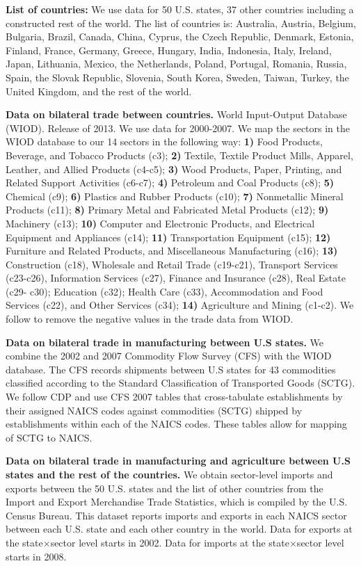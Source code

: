 \documentclass[12pt]{article}
\begin{document}
\textbf{List of countries:} We use data for 50 U.S. states, 37 other countries including a constructed rest of the world. The list of countries is: Australia, Austria, Belgium, Bulgaria, Brazil, Canada, China, Cyprus, the Czech Republic, Denmark, Estonia, Finland, France, Germany, Greece, Hungary, India, Indonesia, Italy, Ireland, Japan, Lithuania,
Mexico, the Netherlands, Poland, Portugal, Romania, Russia, Spain, the Slovak Republic, Slovenia, South Korea, Sweden, Taiwan, Turkey, the United Kingdom, and the rest of the world.

\textbf{Data on bilateral trade between countries.} World Input-Output Database (WIOD). Release of 2013. We use data for 2000-2007. We map the sectors in the WIOD database to our 14 sectors in the following way: \textbf{1)} Food Products, Beverage, and Tobacco Products (c3); \textbf{2)} Textile, Textile Product Mills, Apparel, Leather, and Allied Products (c4-c5); \textbf{3)} Wood Products, Paper, Printing, and Related Support Activities (c6-c7); \textbf{4)} Petroleum and Coal Products (c8); \textbf{5)} Chemical (c9); \textbf{6)} Plastics and Rubber Products (c10); \textbf{7)} Nonmetallic Mineral Products (c11); \textbf{8)} Primary Metal and Fabricated Metal Products (c12); \textbf{9)} Machinery (c13); \textbf{10)} Computer and Electronic Products, and Electrical Equipment and Appliances (c14); \textbf{11)} Transportation Equipment (c15); \textbf{12)} Furniture and Related Products, and Miscellaneous Manufacturing (c16); \textbf{13)} Construction (c18), Wholesale and Retail Trade (c19-c21), Transport Services (c23-c26), Information Services (c27), Finance and Insurance (c28), Real Estate (c29-
c30); Education (c32); Health Care (c33), Accommodation and Food Services (c22), and Other Services (c34); \textbf{14)} Agriculture and Mining (c1-c2). We follow \cite{Costinot2014} to remove the negative values in the trade data from WIOD.

\textbf{Data on bilateral trade in manufacturing between U.S states.} We combine the 2002 and 2007 Commodity Flow Survey (CFS) with the WIOD database. The CFS records shipments between U.S states for 43 commodities classified according to the Standard Classification of Transported Goods (SCTG). We follow CDP and use CFS 2007 tables that cross-tabulate establishments by their assigned NAICS codes against commodities (SCTG) shipped by establishments within each of the NAICS codes. These tables allow for mapping of SCTG to NAICS.

\textbf{Data on bilateral trade in manufacturing and agriculture between U.S states and the rest of the countries.} We obtain sector-level imports and exports  between the 50 U.S. states and the list of other countries from the Import and Export Merchandise Trade Statistics, which is compiled by the U.S. Census Bureau. This dataset  reports imports and exports in each NAICS sector between each U.S. state and each other country in the world. Data for exports at the  state$\times$sector level starts in 2002. Data for imports at the state$\times$sector level starts in 2008.
\end{document}
